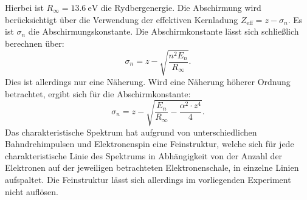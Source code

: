 Hierbei ist $R_\infty=\SI{13.6}{\electronvolt}$ die Rydbergenergie. Die Abschirmung wird berücksichtigt über die Verwendung der effektiven Kernladung $Z_\mathrm{eff}=z-\sigma_n$. Es ist $\sigma_n$ die Abschirmungskonstante.
Die Abschirmkonstante lässt sich schließlich berechnen über:
\begin{equation}
  \sigma_n=z-\sqrt{\frac{n^2 E_n}{R_\infty}} \text{.}
\end{equation}
Dies ist allerdings nur eine Näherung. Wird eine Näherung höherer Ordnung betrachtet, ergibt sich für die Abschirmkonstante:
\begin{equation}
  \label{eqn:schirm}
  \sigma_n=z-\sqrt{\frac{E_n}{R_\infty}-\frac{\alpha^2\cdot z^4}{4}} \text{.}
\end{equation}
Das charakteristische Spektrum hat aufgrund von unterschiedlichen Bahndrehimpulsen und Elektronenspin eine Feinstruktur, welche sich für jede charakteristische Linie des Spektrums in Abhängigkeit von der Anzahl der Elektronen auf der jeweiligen betrachteten Elektronenschale, in einzelne Linien aufspaltet.
Die Feinstruktur lässt sich allerdings im vorliegenden Experiment nicht auflösen.

